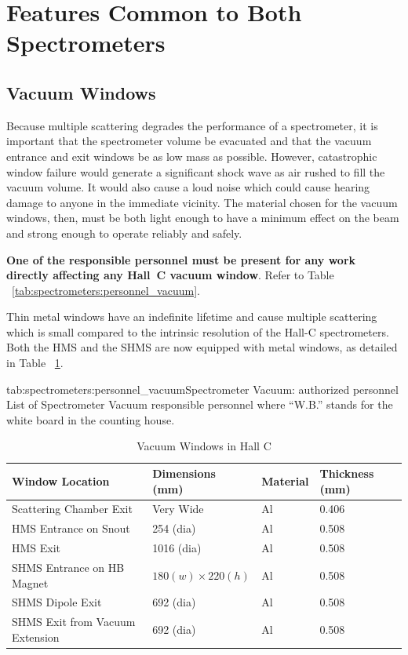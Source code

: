 \section{Features Common to Both Spectrometers}

\subsection{Vacuum Windows}

Because multiple scattering degrades the performance of a spectrometer, it is
important that the spectrometer volume be evacuated and that the vacuum
entrance and exit windows be as low mass as possible. However,
catastrophic window failure would generate a significant shock wave as air
rushed to fill the vacuum volume. It would also cause a loud noise which
could cause hearing damage to anyone in the immediate vicinity.
The material chosen for the vacuum windows, then, must be both light enough
to have a minimum effect on the beam and strong enough to operate reliably and safely.

{\bf One of the responsible personnel must be present for
any work directly affecting any Hall~C vacuum window}. Refer to Table ~\ref{tab:spectrometers:personnel_vacuum}.

Thin metal windows have an indefinite lifetime and cause
multiple scattering which is small compared to the intrinsic resolution of
the Hall-C spectrometers. Both the HMS and the SHMS are now equipped
with metal windows, as detailed in Table ~\ref{tab:hall_c_windows_specs}.

\begin{namestab}{tab:spectrometers:personnel_vacuum}{Spectrometer Vacuum: authorized personnel}{%
      List of Spectrometer Vacuum responsible personnel where ``W.B.'' stands for the white board
      in the counting house.}
   \MikeFowler{}
   \WalterKellner{}
   \AndyKenyon{}
\end{namestab}

\begin{table}
\begin{center}
\caption{Vacuum Windows in Hall C\label{tab:hall_c_windows_specs}}
\begin{tabular}{|l|l|l|l|}
\hline
Window Location				& Dimensions (mm) 	 	& Material & Thickness (mm) \\ \hline
Scattering Chamber Exit			& Very Wide		& Al		& 0.406\\
HMS Entrance	on Snout			& 254  (dia)		& Al		& 0.508\\
HMS Exit						& 1016  (dia)		& Al		& 0.508\\
SHMS Entrance on HB Magnet		& $180(w) \times 220(h)$	& Al	& 0.508\\
SHMS Dipole Exit				& 692 (dia)		& Al		& 0.508\\
SHMS Exit from Vacuum Extension	& 692 (dia)		& Al		& 0.508\\
\hline
\end{tabular}
\end{center}
\end{table}

